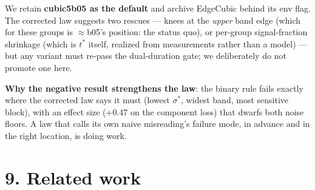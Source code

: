 \documentclass[
]{article}
\begin{document}
We retain \textbf{cubic5b05 as the default} and archive EdgeCubic behind
its env flag. The corrected law suggests two rescues --- knees at the
\emph{upper} band edge (which for these groups is \(\approx\){}b05's
position: the status quo), or per-group signal-fraction shrinkage (which
is \(t^*\) itself, realized from measurements rather than a model) ---
but any variant must re-pass the dual-duration gate; we deliberately do
not promote one here.

\textbf{Why the negative result strengthens the law}: the binary rule
fails exactly where the corrected law says it must (lowest \(\sigma^*\),
widest band, most sensitive block), with an effect size (+0.47 on the
component loss) that dwarfs both noise floors. A law that calls its own
naive misreading's failure mode, in advance and in the right location,
is doing work.

\section{9. Related work}\label{related-work}
\end{document}
